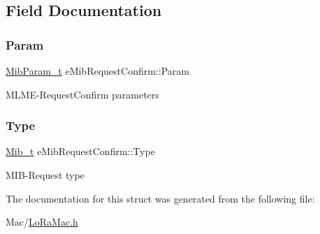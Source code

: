 \subsection{Field Documentation}
\mbox{\label{structeMibRequestConfirm_a71cc0adf3fe8337eaa6dc69a1463c8bc}} 
\subsubsection{\texorpdfstring{Param}{Param}}
{\footnotesize\ttfamily \hyperlink{group__LORAMAC_gae9f2411f44447849f5b36bcaca1feb5c}{Mib\+Param\+\_\+t} e\+Mib\+Request\+Confirm\+::\+Param}

M\+L\+M\+E-\/\+Request\+Confirm parameters \mbox{\label{structeMibRequestConfirm_ad3d963c102bbd81f7dd9918f4c1731c1}} 
\subsubsection{\texorpdfstring{Type}{Type}}
{\footnotesize\ttfamily \hyperlink{group__LORAMAC_gaf17bd3de9ec75e4954be9a070cd8ddf9}{Mib\+\_\+t} e\+Mib\+Request\+Confirm\+::\+Type}

M\+I\+B-\/\+Request type 

The documentation for this struct was generated from the following file\+:\begin{DoxyCompactItemize}
\item 
Mac/\hyperlink{LoRaMac_8h}{Lo\+Ra\+Mac.\+h}\end{DoxyCompactItemize}
